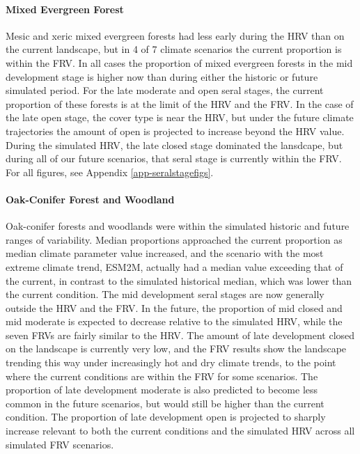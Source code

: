 \documentclass[12pt]{article}
\begin{document}
\begin{spacing}{1}
\paragraph{Mixed Evergreen Forest} Mesic and xeric mixed evergreen forests had less early during the HRV than on the current landscape, but in 4 of 7 climate scenarios the current proportion is within the FRV. In all cases the proportion of mixed evergreen forests in the mid development stage is higher now than during either the historic or future simulated period. For the late moderate and open seral stages, the current proportion of these forests is at the limit of the HRV and the FRV. In the case of the late open stage, the cover type is near the HRV, but under the future climate trajectories the amount of open is projected to increase beyond the HRV value. During the simulated HRV, the late closed stage dominated the lansdcape, but during all of our future scenarios, that seral stage is currently within the FRV. For all figures, see Appendix \ref{app-seralstagefigs}.

\paragraph{Oak-Conifer Forest and Woodland} Oak-conifer forests and woodlands were within the simulated historic and future ranges of variability. Median proportions approached the current proportion as median climate parameter value increased, and the scenario with the most extreme climate trend, ESM2M, actually had a median value exceeding that of the current, in contrast to the simulated historical median, which was lower than the current condition. The mid development seral stages are now generally outside the HRV and the FRV. In the future, the proportion of mid closed and mid moderate is expected to decrease relative to the simulated HRV, while the seven FRVs are fairly similar to the HRV. The amount of late development closed on the landscape is currently very low, and the FRV results show the landscape trending this way under increasingly hot and dry climate trends, to the point where the current conditions are within the FRV for some scenarios. The proportion of late development moderate is also predicted to become less common in the future scenarios, but would still be higher than the current condition. The proportion of late development open is projected to sharply increase relevant to both the current conditions and the simulated HRV across all simulated FRV scenarios.


\end{spacing}
\end{document}
